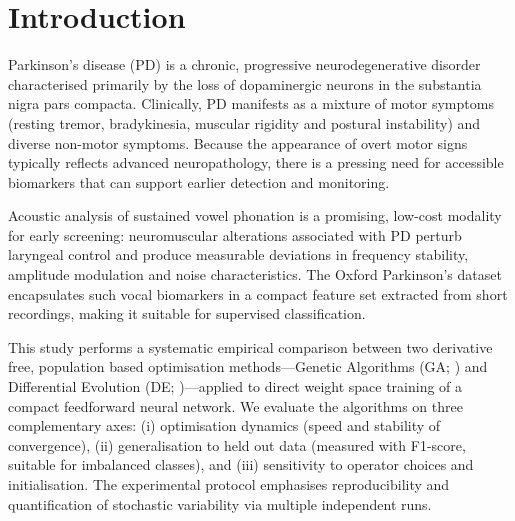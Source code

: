 \documentclass[12pt, a4paper]{article}
\begin{document}
\pagestyle{mainstyle}
\newpage
\tableofcontents
\newpage

\section{Introduction}

Parkinson's disease (PD) is a chronic, progressive neurodegenerative disorder characterised primarily by the loss of dopaminergic neurons in the substantia nigra pars compacta. Clinically, PD manifests as a mixture of motor symptoms (resting tremor, bradykinesia, muscular rigidity and postural instability) and diverse non-motor symptoms. Because the appearance of overt motor signs typically reflects advanced neuropathology, there is a pressing need for accessible biomarkers that can support earlier detection and monitoring.

Acoustic analysis of sustained vowel phonation is a promising, low-cost modality for early screening: neuromuscular alterations associated with PD perturb laryngeal control and produce measurable deviations in frequency stability, amplitude modulation and noise characteristics. The Oxford Parkinson's dataset \citep{little2009} encapsulates such vocal biomarkers in a compact feature set extracted from short recordings, making it suitable for supervised classification.


This study performs a systematic empirical comparison between two derivative free, population based optimisation methods—Genetic Algorithms (GA; \citealp{goldberg1989}) and Differential Evolution (DE; \citealp{storn1997})—applied to direct weight space training of a compact feedforward neural network. We evaluate the algorithms on three complementary axes: (i) optimisation dynamics (speed and stability of convergence), (ii) generalisation to held out data (measured with F1-score, suitable for imbalanced classes), and (iii) sensitivity to operator choices and initialisation. The experimental protocol emphasises reproducibility and quantification of stochastic variability via multiple independent runs.
\end{document}
